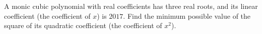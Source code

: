 A monic cubic polynomial with real coefficients has three real roots, and its linear coefficient (the coefficient of $x$) is $2017$. Find the minimum possible value of the square of its quadratic coefficient (the coefficient of $x^2$).
